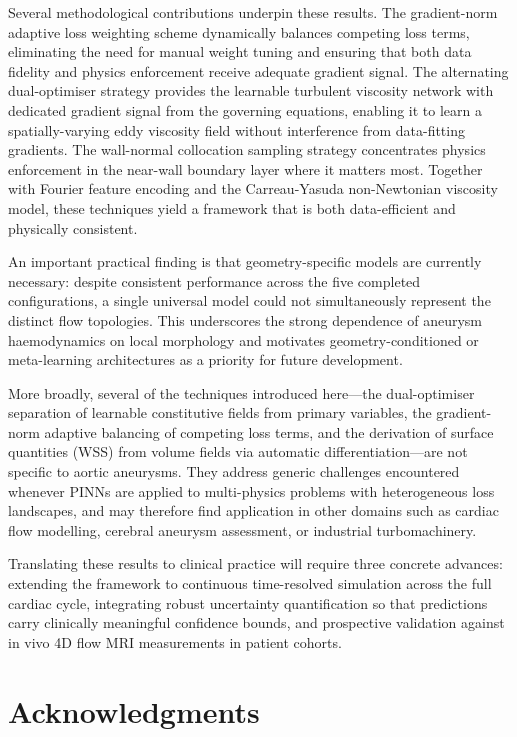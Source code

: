 \documentclass[11pt,a4paper]{article}
\begin{document}
Several methodological contributions underpin these results. The gradient-norm adaptive loss weighting scheme dynamically balances competing loss terms, eliminating the need for manual weight tuning and ensuring that both data fidelity and physics enforcement receive adequate gradient signal. The alternating dual-optimiser strategy provides the learnable turbulent viscosity network with dedicated gradient signal from the governing equations, enabling it to learn a spatially-varying eddy viscosity field without interference from data-fitting gradients. The wall-normal collocation sampling strategy concentrates physics enforcement in the near-wall boundary layer where it matters most. Together with Fourier feature encoding and the Carreau-Yasuda non-Newtonian viscosity model, these techniques yield a framework that is both data-efficient and physically consistent.

An important practical finding is that geometry-specific models are currently necessary: despite consistent performance across the five completed configurations, a single universal model could not simultaneously represent the distinct flow topologies. This underscores the strong dependence of aneurysm haemodynamics on local morphology and motivates geometry-conditioned or meta-learning architectures as a priority for future development.

More broadly, several of the techniques introduced here---the dual-optimiser separation of learnable constitutive fields from primary variables, the gradient-norm adaptive balancing of competing loss terms, and the derivation of surface quantities (WSS) from volume fields via automatic differentiation---are not specific to aortic aneurysms. They address generic challenges encountered whenever PINNs are applied to multi-physics problems with heterogeneous loss landscapes, and may therefore find application in other domains such as cardiac flow modelling, cerebral aneurysm assessment, or industrial turbomachinery.

Translating these results to clinical practice will require three concrete advances: extending the framework to continuous time-resolved simulation across the full cardiac cycle, integrating robust uncertainty quantification so that predictions carry clinically meaningful confidence bounds, and prospective validation against in vivo 4D flow MRI measurements in patient cohorts.

\section*{Acknowledgments}
\end{document}
